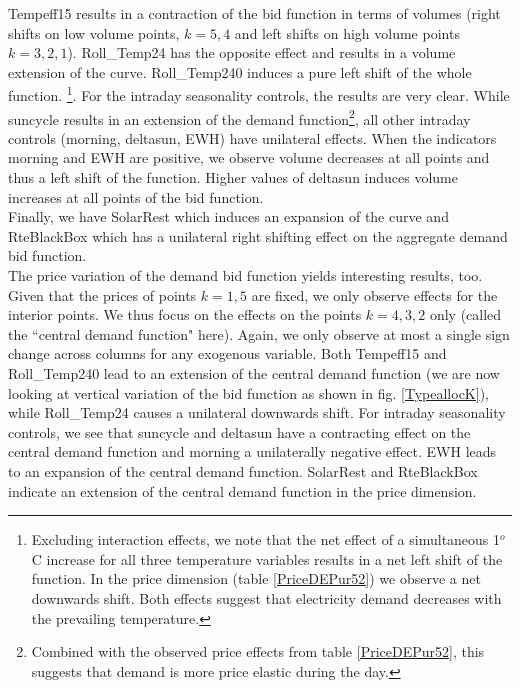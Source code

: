 Tempeff15 results in a contraction of the bid function in terms of volumes (right shifts on low volume points, $k=5,4$ and left shifts on high volume points $k=3,2,1$). Roll\_Temp24 has the opposite effect and results in a volume extension of the curve. Roll\_Temp240 induces a pure left shift of the whole function. \footnote{Excluding interaction effects, we note that the net effect of a simultaneous 1$^o$C increase for all three temperature variables results in a net left shift of the function. In the price dimension (table \ref{PriceDEPur52}) we observe a net downwards shift. Both effects suggest that electricity demand decreases with the prevailing temperature.}. 
For the intraday seasonality controls, the results are very clear. While suncycle results in an extension of the demand function\footnote{Combined with the observed price effects from table \ref{PriceDEPur52}, this suggests that demand is more price elastic during the day.}, all other intraday controls (morning, deltasun, EWH) have unilateral effects. When the indicators morning and EWH are positive, we observe volume decreases at all points and thus a left shift of the function. Higher values of deltasun induces volume increases at all points of the bid function.\\

Finally, we have SolarRest which induces an expansion of the curve and RteBlackBox which has a unilateral right shifting effect on the aggregate demand bid function. \\

The price variation of the demand bid function yields interesting results, too. Given that the prices of points $k=1,5$ are fixed, we only observe effects for the interior points. We thus focus on the effects on the points $k=4,3,2$ only (called the ``central demand function" here). %
Again, we only observe at most a single sign change across columns for any exogenous variable. 
Both Tempeff15 and Roll\_Temp240 lead to an extension of the central demand function (we are now looking at vertical variation of the bid function as shown in fig. \ref{TypeallocK}), while Roll\_Temp24 causes a  unilateral downwards shift. 
For intraday seasonality controls, we see that suncycle and deltasun have a contracting effect on the central demand function and morning a unilaterally negative effect. EWH leads to an expansion of the central demand function. 
SolarRest and RteBlackBox indicate an extension of the central demand function in the price dimension. \\

